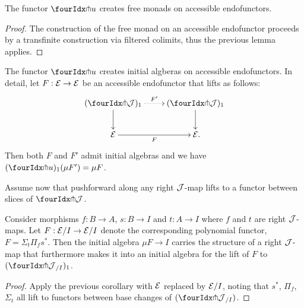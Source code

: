 \documentclass[reqno,10pt,a4paper,oneside,draft]{amsart}
\begin{document}
\begin{corollary}
The functor $\liftr{u}$ creates free monads on accessible endofunctors.
\end{corollary}

\begin{proof}
The construction of the free monad on an accessible endofunctor proceeds by a transfinite construction via filtered colimits, thus the previous lemma applies.
\end{proof}

\begin{corollary}
The functor $\liftr{u}$ creates initial algberas on accessible endofunctors.
In detail, let $F : \calE \to \calE$ be an accessible endofunctor that lifts as follows:
\[
\xymatrix{
  (\liftr{\cal{J}})_1
  \ar@{.>}[r]^{F'}
  \ar[d]
&
  (\liftr{\cal{J}})_1
  \ar[d]
\\
  \calE
  \ar[r]_{F}
&
  \calE
\rlap{.}}
\]
Then both $F$ and $F'$ admit initial algebras and we have $(\liftr{u})_1(\mu F') = \mu F$.
\end{corollary}

Assume now that pushforward along any right $\cal{J}$-map lifts to a functor between slices of $\liftr{\cal{J}}$.

\begin{corollary}
Consider morphisms $f : B \to A$, $s : B \to I$ and $t : A \to I$ where $f$ and $t$ are right $\cal{J}$-maps.
Let $F : \catE/I \to \catE/I$ denote the corresponding polynomial functor, \ie $F = \Sigma_t \Pi_f s^*$.
Then the initial algebra $\mu F \to I$ carries the structure of a right $\cal{J}$-map that furthermore makes it into an initial algebra for the lift of $F$ to $(\liftr{\cal{J}}_{/I})_1$.
\end{corollary}

\begin{proof}
Apply the previous corollary with $\calE$ replaced by $\calE/I$, noting that $s^*$, $\Pi_f$, $\Sigma_t$ all lift to functors between base changes of $(\liftr{\cal{J}}_{/I})$.
\end{proof}
\end{document}
